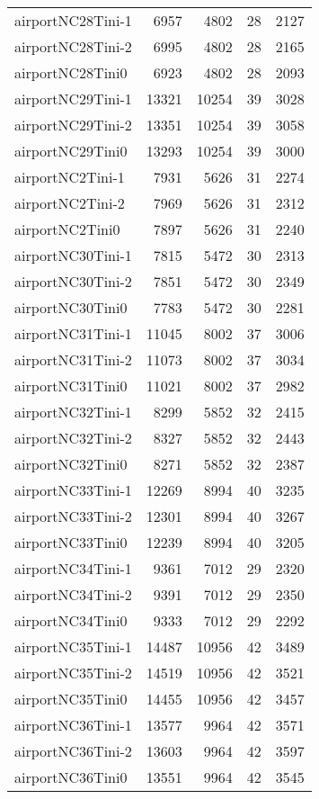 \begin{longtable}{lrrrr}
airportNC28Tini-1 & 6957 & 4802 & 28 & 2127 \\
airportNC28Tini-2 & 6995 & 4802 & 28 & 2165 \\
airportNC28Tini0 & 6923 & 4802 & 28 & 2093 \\
airportNC29Tini-1 & 13321 & 10254 & 39 & 3028 \\
airportNC29Tini-2 & 13351 & 10254 & 39 & 3058 \\
airportNC29Tini0 & 13293 & 10254 & 39 & 3000 \\
airportNC2Tini-1 & 7931 & 5626 & 31 & 2274 \\
airportNC2Tini-2 & 7969 & 5626 & 31 & 2312 \\
airportNC2Tini0 & 7897 & 5626 & 31 & 2240 \\
airportNC30Tini-1 & 7815 & 5472 & 30 & 2313 \\
airportNC30Tini-2 & 7851 & 5472 & 30 & 2349 \\
airportNC30Tini0 & 7783 & 5472 & 30 & 2281 \\
airportNC31Tini-1 & 11045 & 8002 & 37 & 3006 \\
airportNC31Tini-2 & 11073 & 8002 & 37 & 3034 \\
airportNC31Tini0 & 11021 & 8002 & 37 & 2982 \\
airportNC32Tini-1 & 8299 & 5852 & 32 & 2415 \\
airportNC32Tini-2 & 8327 & 5852 & 32 & 2443 \\
airportNC32Tini0 & 8271 & 5852 & 32 & 2387 \\
airportNC33Tini-1 & 12269 & 8994 & 40 & 3235 \\
airportNC33Tini-2 & 12301 & 8994 & 40 & 3267 \\
airportNC33Tini0 & 12239 & 8994 & 40 & 3205 \\
airportNC34Tini-1 & 9361 & 7012 & 29 & 2320 \\
airportNC34Tini-2 & 9391 & 7012 & 29 & 2350 \\
airportNC34Tini0 & 9333 & 7012 & 29 & 2292 \\
airportNC35Tini-1 & 14487 & 10956 & 42 & 3489 \\
airportNC35Tini-2 & 14519 & 10956 & 42 & 3521 \\
airportNC35Tini0 & 14455 & 10956 & 42 & 3457 \\
airportNC36Tini-1 & 13577 & 9964 & 42 & 3571 \\
airportNC36Tini-2 & 13603 & 9964 & 42 & 3597 \\
airportNC36Tini0 & 13551 & 9964 & 42 & 3545 \\

\end{longtable}

